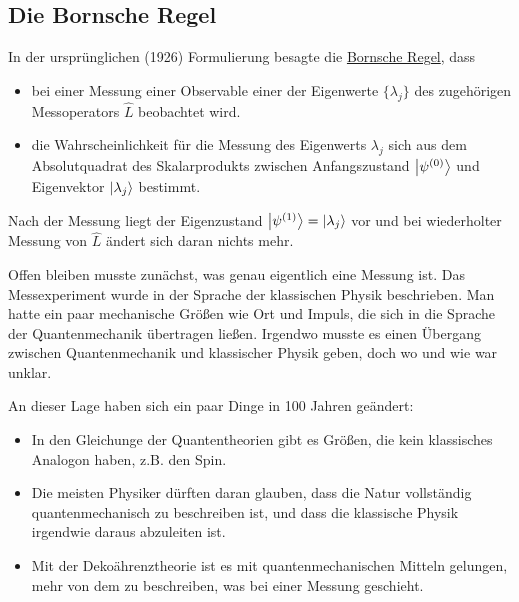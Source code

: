 \documentclass[12pt]{article}
\begin{document}
\subsection{Die Bornsche Regel}

In der ursprünglichen (1926) Formulierung besagte die \href{https://en.wikipedia.org/wiki/Born_rule}{Bornsche Regel}, dass 
\begin{itemize}
\item bei einer Messung einer Observable einer der Eigenwerte $\{\lambda_j\}$ des zugehörigen Messoperators $\hat{L}$ beobachtet wird.
\item die Wahrscheinlichkeit für die Messung des Eigenwerts $\lambda_j$ sich aus dem Absolutquadrat des Skalarprodukts zwischen Anfangszustand $\ket{\psi^{(0)}}$ und Eigenvektor $\ket{\lambda_j}$ bestimmt.
\end{itemize}
Nach der Messung liegt der Eigenzustand $\ket{\psi^{(1)}} = \ket{\lambda_j}$ vor und bei wiederholter Messung von $\hat{L}$ ändert sich daran nichts mehr. 

Offen bleiben musste zunächst, was genau eigentlich eine Messung ist. Das Messexperiment wurde in der Sprache der klassischen Physik beschrieben. Man hatte ein paar mechanische Größen wie Ort und Impuls, die sich in die Sprache der Quantenmechanik übertragen ließen. Irgendwo musste es einen Übergang zwischen Quantenmechanik und klassischer Physik geben, doch wo und wie war unklar.

An dieser Lage haben sich ein paar Dinge in 100 Jahren geändert:
\begin{itemize}
\item In den Gleichunge der Quantentheorien gibt es Größen, die kein klassisches Analogon haben, z.B. den Spin. 
\item Die meisten Physiker dürften daran glauben, dass die Natur vollständig quantenmechanisch zu beschreiben ist, und dass die klassische Physik irgendwie daraus abzuleiten ist.
\item Mit der Dekoährenztheorie ist es mit quantenmechanischen Mitteln gelungen, mehr von dem zu beschreiben, was bei einer Messung geschieht.
\end{itemize}
\end{document}

